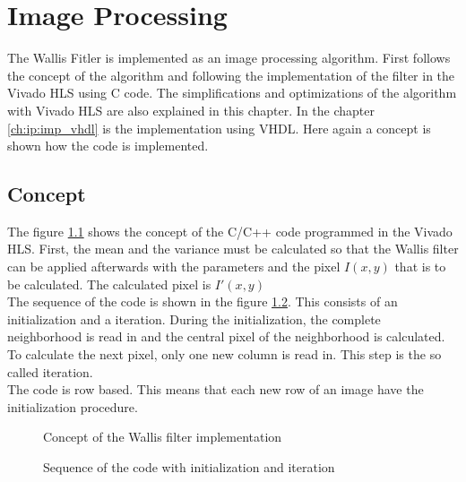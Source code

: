 %
%
\chapter{Image Processing}  \label{chapt:image_processing}
The Wallis Fitler is implemented as an image processing algorithm. First follows the concept of the algorithm and following the implementation of the filter in the Vivado HLS using C code. The simplifications and optimizations of the algorithm with Vivado HLS are also explained in this chapter. In the chapter \ref{ch:ip:imp_vhdl} is the implementation using VHDL. Here again a concept is shown how the code is implemented.

\section{Concept} \label{ch:ip:concept}
The figure \ref{fig:concept} shows the concept of the C/C++ code programmed in the Vivado HLS. First, the mean and the variance must be calculated so that the Wallis filter can be applied afterwards with the parameters and the pixel $I(x,y)$ that is to be calculated. The calculated pixel is $I'(x,y)$ \\
The sequence of the code is shown in the figure \ref{fig:sequence}. This consists of an initialization and a iteration. During the initialization, the complete neighborhood is read in and the central pixel of the neighborhood is calculated. To calculate the next pixel, only one new column is read in. This step is the so called iteration.\\
The code is row based. This means that each new row of an image have the initialization procedure.

\begin{figure}[tb!]
    \centering
    \begin{adjustbox}{max width=\textwidth}
        
    \end{adjustbox}
    \caption{Concept of the Wallis filter implementation}
    \label{fig:concept}
\end{figure}

\begin{figure}[tb!]
    \centering
    \begin{adjustbox}{max width=\textwidth}
    \end{adjustbox}
    \caption{Sequence of the code with initialization and iteration}
    \label{fig:sequence}
\end{figure}


